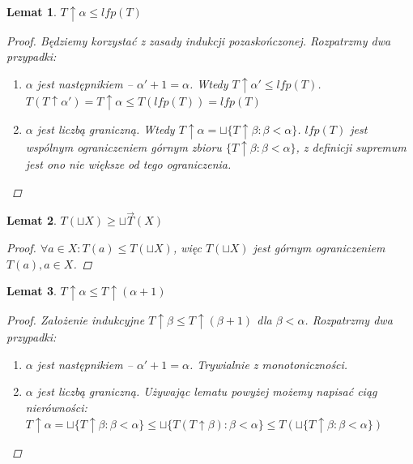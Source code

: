 \documentclass[10pt,a4paper]{article}
\theoremstyle{plain}
\newtheorem{lemma}{Lemat}
\theoremstyle{definition}
\begin{document}
\begin{lemma}
 $ T \uparrow \alpha \leq lfp(T)$
\begin{proof}
 Będziemy korzystać z zasady indukcji pozaskończonej. Rozpatrzmy dwa przypadki:
 \begin{enumerate}
  \item $\alpha$ jest następnikiem -- $\alpha' + 1 = \alpha$. 
	Wtedy $T \uparrow \alpha' \leq lfp(T)$.\\
	$T(T \uparrow \alpha') = T \uparrow \alpha \leq T(lfp(T)) = lfp(T)$
  \item $\alpha$ jest liczbą graniczną. Wtedy $T \uparrow \alpha = 
	\sqcup \lbrace T \uparrow \beta : \beta < \alpha \rbrace$.
	$lfp(T)$ jest wspólnym ograniczeniem górnym zbioru 
	$\lbrace T \uparrow \beta : \beta < \alpha \rbrace$, z definicji supremum 
	jest ono nie większe od tego ograniczenia.
 \end{enumerate}
\end{proof}
\end{lemma}

\begin{lemma}
 $T(\sqcup X) \geq \sqcup \overrightarrow{T}(X)$
 \begin{proof}
 $\forall a \in X: T(a) \leq T(\sqcup X)$, więc $T(\sqcup X)$ jest górnym ograniczeniem $T(a), a \in X$.
 \end{proof}
\end{lemma}


\begin{lemma}
 $ T \uparrow \alpha \leq T \uparrow (\alpha + 1)$
\begin{proof}
 Założenie indukcyjne $ T \uparrow \beta \leq T \uparrow (\beta + 1)$ dla $\beta < \alpha$. Rozpatrzmy dwa przypadki:
 \begin{enumerate}
  \item $\alpha$ jest następnikiem -- $\alpha' + 1 = \alpha$. Trywialnie z monotoniczności.
  \item $\alpha$ jest liczbą graniczną. Używając lematu powyżej możemy napisać ciąg nierówności: \\
  $ T \uparrow \alpha = \sqcup \lbrace T \uparrow \beta : \beta < \alpha \rbrace \leq 
    \sqcup \lbrace  T(T \uparrow \beta) : \beta < \alpha \rbrace \leq
    T(\sqcup \lbrace  T \uparrow \beta : \beta < \alpha \rbrace) $
 \end{enumerate}
\end{proof}
\end{lemma}
\end{document}
